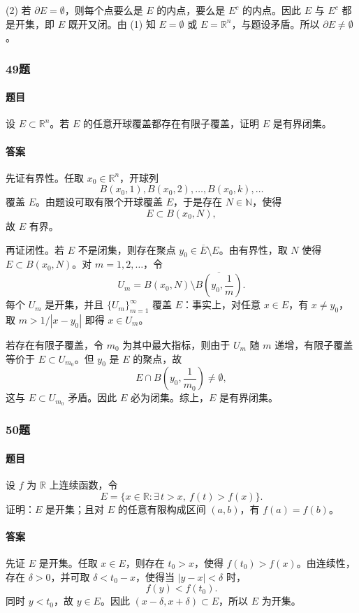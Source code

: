 \documentclass{article}
\begin{document}
(2) 若 $\partial E=\emptyset$，则每个点要么是 $E$ 的内点，要么是 $E^c$ 的内点。因此 $E$ 与 $E^c$ 都是开集，即 $E$ 既开又闭。由 (1) 知 $E=\emptyset$ 或 $E=\mathbb{R}^n$，与题设矛盾。所以 $\partial E\neq\emptyset$。

\subsubsection*{49题}
\paragraph{题目} 设 $E\subset\mathbb{R}^n$。若 $E$ 的任意开球覆盖都存在有限子覆盖，证明 $E$ 是有界闭集。

\paragraph{答案} 先证有界性。任取 $x_0\in\mathbb{R}^n$，开球列
\[
 B(x_0,1),B(x_0,2),\ldots,B(x_0,k),\ldots
\]
覆盖 $E$。由题设可取有限个开球覆盖 $E$，于是存在 $N\in\mathbb{N}$，使得
\[
 E\subset B(x_0,N),
\]
故 $E$ 有界。

再证闭性。若 $E$ 不是闭集，则存在聚点 $y_0\in\overline E\setminus E$。由有界性，取 $N$ 使得 $E\subset B(x_0,N)$。对 $m=1,2,\ldots$，令
\[
 U_m=B(x_0,N)\setminus \overline{B\left(y_0,\frac1m\right)}.
\]
每个 $U_m$ 是开集，并且 $\{U_m\}_{m=1}^{\infty}$ 覆盖 $E$：事实上，对任意 $x\in E$，有 $x\neq y_0$，取 $m>1/|x-y_0|$ 即得 $x\in U_m$。

若存在有限子覆盖，令 $m_0$ 为其中最大指标，则由于 $U_m$ 随 $m$ 递增，有限子覆盖等价于 $E\subset U_{m_0}$。但 $y_0$ 是 $E$ 的聚点，故
\[
 E\cap B\left(y_0,\frac1{m_0}\right)\neq\emptyset,
\]
这与 $E\subset U_{m_0}$ 矛盾。因此 $E$ 必为闭集。综上，$E$ 是有界闭集。

\subsubsection*{50题}
\paragraph{题目} 设 $f$ 为 $\mathbb{R}$ 上连续函数，令
\[
 E=\{x\in\mathbb{R}:\exists\,t>x,\ f(t)>f(x)\}.
\]
证明：$E$ 是开集；且对 $E$ 的任意有限构成区间 $(a,b)$，有 $f(a)=f(b)$。

\paragraph{答案} 先证 $E$ 是开集。任取 $x\in E$，则存在 $t_0>x$，使得 $f(t_0)>f(x)$。由连续性，存在 $\delta>0$，并可取 $\delta<t_0-x$，使得当 $|y-x|<\delta$ 时，
\[
 f(y)<f(t_0).
\]
同时 $y<t_0$，故 $y\in E$。因此 $(x-\delta,x+\delta)\subset E$，所以 $E$ 为开集。
\end{document}
